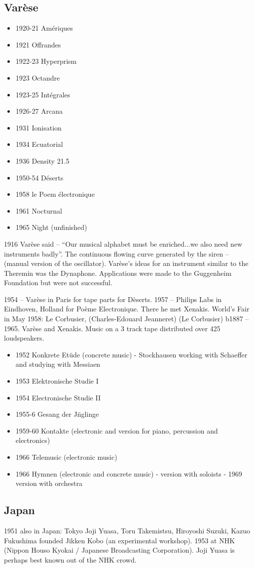 \subsection{Var\`ese}
\begin{itemize}
\item 1920-21		Am\'eriques
\item 1921		Offrandes
\item 1922-23		Hyperprism
\item 1923		Octandre
\item 1923-25		Int\'egrales
\item 1926-27		Arcana
\item 1931		Ionisation
\item 1934		Ecuatorial
\item 1936		Density 21.5
\item 1950-54		D\'eserts
\item 1958		le Poem \'electronique
\item 1961		Nocturnal
\item 1965		Night (unfinished)
\end{itemize}

1916 Varèse said – ``Our musical alphabet must be enriched...we also need new instruments badly''.  The continuous flowing curve generated by the siren – (manual version of the oscillator). Var\`ese's ideas for an instrument similar to the Theremin was the Dynaphone.  Applications were made to the Guggenheim Foundation but were not successful. 

1954 – Var\`ese in Paris for tape parts for D\`eserts. 1957 – Philips Labs in Eindhoven, Holland for Poème Electronique.  There he met Xenakis. World's Fair in May 1958: Le Corbusier, (Charles-Edouard Jeanneret) (Le Corbusier) b1887 – 1965. Var\`ese and Xenakis. Music on a 3 track tape distributed over 425 loudspeakers.

\begin{itemize}
\item 1952 Konkrete Et\"ude (concrete music) - Stockhausen working with Schaeffer and studying with Messiaen
\item 1953 Elektronische Studie I
\item 1954 Electronische Studie II
\item 1955-6 Gesang der J\"nglinge
\item 1959-60 Kontakte (electronic and version for piano, percussion and electronics)
\item 1966 Telemusic (electronic music)
\item 1966 Hymnen (electronic and concrete music) - version with soloists - 1969 version with orchestra
\end{itemize}

\subsection{Japan}
1951 also in Japan: Tokyo
Joji Yuasa, Toru Takemistsu, Hiroyoshi Suzuki, Kazuo Fukushima founded Jikken Kobo (an experimental workshop). 1953 at NHK (Nippon Houso Kyokai / Japanese Broadcasting Corporation).  Joji Yuasa is perhaps best known out of the NHK crowd.

